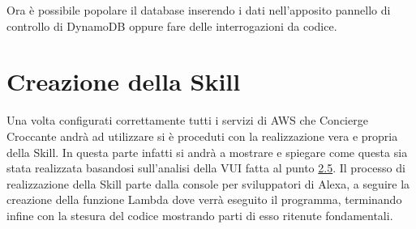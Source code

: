 Ora è possibile popolare il database inserendo i dati nell'apposito pannello di controllo di DynamoDB oppure fare delle interrogazioni da codice.

\newpage
\section{Creazione della Skill}
Una volta configurati correttamente tutti i servizi di AWS che Concierge Croccante andrà ad utilizzare si è proceduti con la realizzazione vera e propria della Skill. In questa parte infatti si andrà a mostrare e spiegare come questa sia stata realizzata basandosi sull'analisi della VUI fatta al punto \hyperref[vui]{2.5}. Il processo di realizzazione della Skill parte dalla console per sviluppatori di Alexa, a seguire la creazione della funzione Lambda dove verrà eseguito il programma, terminando infine con la stesura del codice mostrando parti di esso ritenute fondamentali. 
